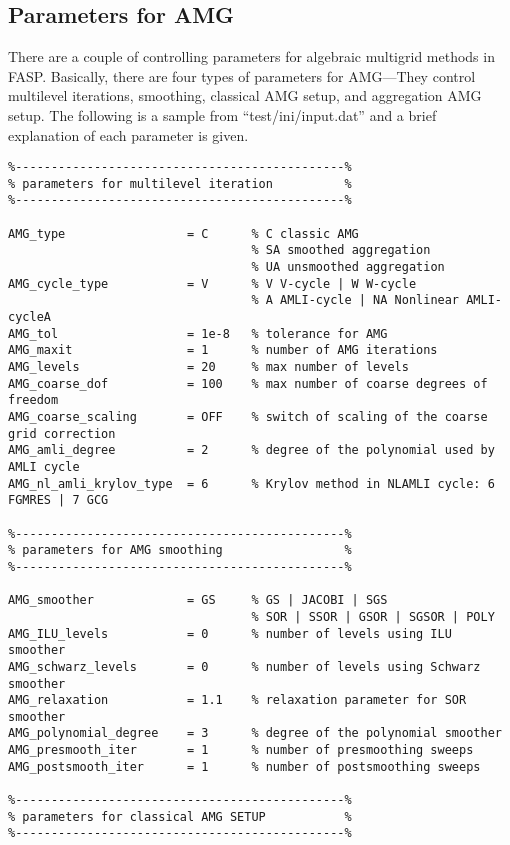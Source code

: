 \documentclass[11pt]{memoir}
\begin{document}
\subsection{Parameters for AMG}

There are a couple of controlling parameters for algebraic multigrid methods in FASP. Basically, there are four types of parameters for AMG---They control multilevel iterations, smoothing, classical AMG setup, and aggregation AMG setup. The following is a sample from ``test/ini/input.dat'' and a brief explanation of each parameter is given. 

\begin{lstlisting}
%----------------------------------------------%
% parameters for multilevel iteration          %
%----------------------------------------------%

AMG_type                 = C      % C classic AMG
                                  % SA smoothed aggregation
                                  % UA unsmoothed aggregation
AMG_cycle_type           = V      % V V-cycle | W W-cycle
                                  % A AMLI-cycle | NA Nonlinear AMLI-cycleA
AMG_tol                  = 1e-8   % tolerance for AMG
AMG_maxit                = 1      % number of AMG iterations
AMG_levels               = 20     % max number of levels
AMG_coarse_dof           = 100    % max number of coarse degrees of freedom
AMG_coarse_scaling       = OFF    % switch of scaling of the coarse grid correction
AMG_amli_degree          = 2      % degree of the polynomial used by AMLI cycle
AMG_nl_amli_krylov_type  = 6      % Krylov method in NLAMLI cycle: 6 FGMRES | 7 GCG

%----------------------------------------------%
% parameters for AMG smoothing                 %
%----------------------------------------------%

AMG_smoother             = GS     % GS | JACOBI | SGS 
                                  % SOR | SSOR | GSOR | SGSOR | POLY
AMG_ILU_levels           = 0      % number of levels using ILU smoother
AMG_schwarz_levels       = 0      % number of levels using Schwarz smoother
AMG_relaxation           = 1.1    % relaxation parameter for SOR smoother 
AMG_polynomial_degree    = 3      % degree of the polynomial smoother
AMG_presmooth_iter       = 1      % number of presmoothing sweeps
AMG_postsmooth_iter      = 1      % number of postsmoothing sweeps

%----------------------------------------------%
% parameters for classical AMG SETUP           %
%----------------------------------------------%


\end{lstlisting}
\end{document}
